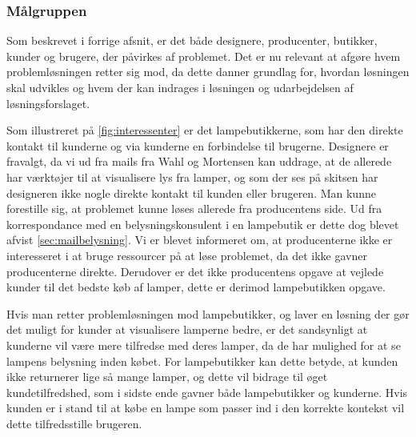 \subsubsection{Målgruppen}
Som beskrevet i forrige afsnit, er det både designere, producenter, butikker, kunder og brugere, der påvirkes af problemet. Det er nu relevant at afgøre hvem problemløsningen retter sig mod, da dette danner grundlag for, hvordan løsningen skal udvikles og hvem der kan indrages i løsningen og udarbejdelsen af løsningsforslaget.

Som illustreret på \ref{fig:interessenter} er det lampebutikkerne, som har den direkte kontakt til kunderne og via kunderne en forbindelse til brugerne. Designere er fravalgt, da vi ud fra mails fra Wahl og Mortensen kan uddrage, at de allerede har værktøjer til at visualisere lys fra lamper, og som der ses på skitsen har designeren ikke nogle direkte kontakt til kunden eller brugeren. Man kunne forestille sig, at problemet kunne løses allerede fra producentens side. Ud fra korrespondance med en belysningskonsulent i en lampebutik er dette dog blevet afvist \ref{sec:mailbelysning}. Vi er blevet informeret om, at producenterne ikke er interesseret i at bruge ressourcer på at løse problemet, da det ikke gavner producenterne direkte. Derudover er det ikke producentens opgave at vejlede kunder til det bedste køb af lamper, dette er derimod lampebutikken opgave.

Hvis man retter problemløsningen mod lampebutikker, og laver en løsning der gør det muligt for kunder at visualisere lamperne bedre, er det sandsynligt at kunderne vil være mere tilfredse med deres lamper, da de har mulighed for at se lampens belysning inden købet. For lampebutikker kan dette betyde, at kunden ikke returnerer lige så mange lamper, og dette vil bidrage til øget kundetilfredshed, som i sidste ende gavner både lampebutikker og kunderne. Hvis kunden er i stand til at købe en lampe som passer ind i den korrekte kontekst vil dette tilfredsstille brugeren. 